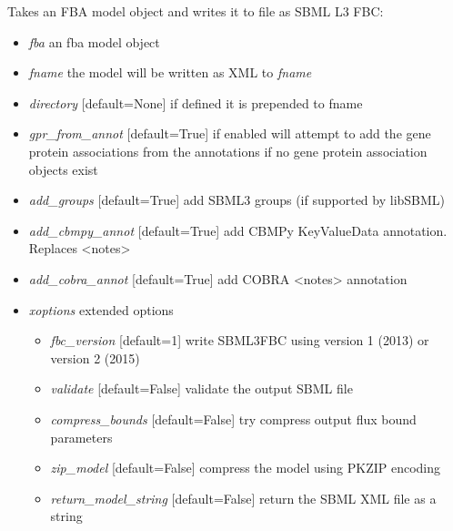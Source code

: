 \documentclass[a4paper,11pt,english]{sphinxmanual}
\begin{document}
\begin{fulllineitems}
\label{modules_doc:cbmpy.CBWrite.writeSBML3FBC}
Takes an FBA model object and writes it to file as SBML L3 FBC:
\begin{itemize}
\item {} 
\emph{fba} an fba model object

\item {} 
\emph{fname} the model will be written as XML to \emph{fname}

\item {} 
\emph{directory} {[}default=None{]} if defined it is prepended to fname

\item {} 
\emph{gpr\_from\_annot} {[}default=True{]} if enabled will attempt to add the gene protein associations from the annotations
if no gene protein association objects exist

\item {} 
\emph{add\_groups} {[}default=True{]} add SBML3 groups (if supported by libSBML)

\item {} 
\emph{add\_cbmpy\_annot} {[}default=True{]} add CBMPy KeyValueData annotation. Replaces \textless{}notes\textgreater{}

\item {} 
\emph{add\_cobra\_annot} {[}default=True{]} add COBRA \textless{}notes\textgreater{} annotation

\item {} 
\emph{xoptions} extended options
\begin{itemize}
\item {} 
\emph{fbc\_version} {[}default=1{]} write SBML3FBC using version 1 (2013) or version 2 (2015)

\item {} 
\emph{validate} {[}default=False{]} validate the output SBML file

\item {} 
\emph{compress\_bounds} {[}default=False{]} try compress output flux bound parameters

\item {} 
\emph{zip\_model} {[}default=False{]} compress the model using PKZIP encoding

\item {} 
\emph{return\_model\_string} {[}default=False{]} return the SBML XML file as a string

\end{itemize}

\end{itemize}

\end{fulllineitems}
\end{document}
